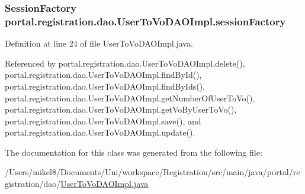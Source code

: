 \hypertarget{classportal_1_1registration_1_1dao_1_1UserToVoDAOImpl_aaee7493b3273ae50e1594f8cbcb07c46}{
\subsubsection[{sessionFactory}]{\setlength{\rightskip}{0pt plus 5cm}SessionFactory {\bf portal.registration.dao.UserToVoDAOImpl.sessionFactory}}}
\label{classportal_1_1registration_1_1dao_1_1UserToVoDAOImpl_aaee7493b3273ae50e1594f8cbcb07c46}


Definition at line 24 of file UserToVoDAOImpl.java.



Referenced by portal.registration.dao.UserToVoDAOImpl.delete(), portal.registration.dao.UserToVoDAOImpl.findById(), portal.registration.dao.UserToVoDAOImpl.findByIds(), portal.registration.dao.UserToVoDAOImpl.getNumberOfUserToVo(), portal.registration.dao.UserToVoDAOImpl.getVoByUserToVo(), portal.registration.dao.UserToVoDAOImpl.save(), and portal.registration.dao.UserToVoDAOImpl.update().



The documentation for this class was generated from the following file:\begin{DoxyCompactItemize}
\item 
/Users/mikel8/Documents/Uni/workspace/Registration/src/main/java/portal/registration/dao/\hyperlink{UserToVoDAOImpl_8java}{UserToVoDAOImpl.java}\end{DoxyCompactItemize}
